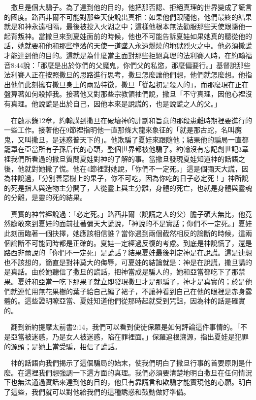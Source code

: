 \documentclass{book}
\begin{document}
　撒旦是個大騙子。為了達到他的目的，他把那否認、拒絕真理的世界變成了謊言的國度。路西非爾不可能對那些天使說出真相：如果他們跟隨他，他們最終的結果就是和神永遠相隔，最後被投入火湖之中；這樣他根本無法勸服那些天使跟隨他一起背叛神。當撒旦來到夏娃面前的時候，他也不可能告訴夏娃如果她真的聽從他的話，她就要和他和那些墮落的天使一道墜入永遠燃燒的地獄烈火之中。他必須撒謊才能達到他的目的。這就是為什麼當主面對那些拒絕真理的法利賽人時，在約翰福音8:44說：「那麼是出於你們的父魔鬼，你們父的私慾，那麼偏要行。」基督說那些法利賽人正在按照撒旦的思路進行思考，撒旦怎麼讓他們想，他們就怎麼想。他指出他們此刻擁有撒旦身上的兩點特徵，撒旦「從起初是殺人的」，而那麼現在正在盤算著如何殺掉我。接著他又對那些宗教領袖們說，撒旦「不守真理，因他心裡沒有真理。他說謊是出於自己，因他本來是說謊的，也是說謊之人的父。」

　在啟示錄12章，約翰講到撒旦在破壞神的計劃和旨意的那段患難時期裡要進行的一些工作。接著他在9節裡指明他一直那條大龍來象征的「就是那古蛇，名叫魔鬼，又叫撒旦，是迷惑普天下的」。他欺騙了夏娃來跟隨他；結果他的騙局一直都籠罩在亞當所有子孫后代的心頭，整個世界都被他騙了。約翰沒有忘記創世記3章裡我們所看過的撒旦質問夏娃對神的了解的事。當撒旦發現夏娃知道神的話語之後，他就對她撒了慌。他在4節裡對她說，「你們不一定死。」這是個彌天大謊，因為神說過，「分別善惡樹上的果子，你不可吃，因為你吃的日子必定死！」神所說的死是指人與造物主分開了，人從靈上與主分離，身體的死亡，也就是身體與靈魂的分離，是靈的死的結果。

　真實的神曾經說過：「必定死。」路西非爾（說謊之人的父）膽子碩大無比，他竟然膽敢來到夏娃的面前扯著彌天大謊說，「神說的不是實話；你們不一定死。」夏娃此刻面臨著一個抉擇，她應該相信誰？當你遇到兩個截然相反的論斷的時候，這兩個論斷不可能同時都是正確的。夏娃一定經過反復的考慮。到底是神說慌了，還是路西非爾說的「你們不一定死」是謊話？結果夏娃最後判定神是在說謊。這是連想也不該想的，簡直是對神莫大的侮辱，可夏娃的結論就是：神是在說謊，撒旦講的是真話。由於她聽信了撒旦的謊話，把神當成是騙人的，她和亞當都吃下了那禁果。夏娃和亞當一吃下那果子就立即發現撒旦才是那騙子，神才是真實的；於是他們就連忙用無花果樹的葉子給自己編了裙子，不讓神看到自己在他的眼裡是赤身露體的。這些證明瞭亞當、夏娃知道他們從那時起就受到咒詛，因為神的話是確實的。

　翻到新約提摩太前書2:14，我們可以看到使徒保羅是如何評論這件事情的。「不是亞當被迷惑，乃是女人被迷惑，陷在罪裡面。」保羅追根溯源，指出夏娃是犯罪的源頭；是她上當受騙，相信了謊話。

　神的話語向我們揭示了這個騙局的始末，使我們明白了撒旦行事的首要原則是什麼。在這裡我們想強調一下這方面的真理。我們必須要清楚地明白撒旦在任何情況下也無法通過實話來達到他的目的，他只有靠謊言和欺騙才能實現他的心願。明白了這些，我們就可以對他給我們的這種誘惑和鼓動做好準備。
\end{document}
